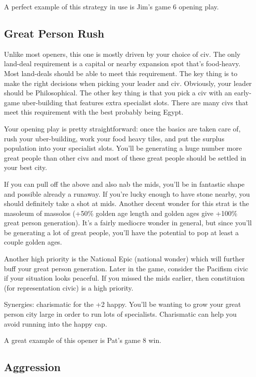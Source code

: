 \documentclass[10pt]{article}
\begin{document}
A perfect example of this strategy in use is Jim's game 6 opening play.

\subsection*{Great Person Rush}

Unlike most openers, this one is mostly driven by your choice of
civ. The only land-deal requirement is a capital or nearby expansion
spot that's food-heavy. Most land-deals should be able to meet this
requirement. The key thing is to make the right decisions when picking
your leader and civ. Obviously, your leader should be
Philosophical. The other key thing is that you pick a civ with an
early-game uber-building that features extra specialist slots. There
are many civs that meet this requirement with the best probably being
Egypt.

Your opening play is pretty straightforward: once the basics are taken
care of, rush your uber-building, work your food heavy tiles, and put
the surplus population into your specialist slots. You'll be
generating a huge number more great people than other civs and most of
these great people should be settled in your best city.

If you can pull off the above and also nab the mids, you'll be in
fantastic shape and possible already a runaway. If you're lucky enough
to have stone nearby, you should definitely take a shot at
mids. Another decent wonder for this strat is the masoleum of massolos
(+50\% golden age length and golden ages give +100\% great person
generation). It's a fairly mediocre wonder in general, but since
you'll be generating a lot of great people, you'll have the potential
to pop at least a couple golden ages.

Another high priority is the National Epic (national wonder) which
will further buff your great person generation. Later in the game,
consider the Pacifism civic if your situation looks peaceful. If you
missed the mids earlier, then constituion (for representation civic)
is a high priority.

Synergies: charismatic for the +2 happy. You'll be wanting to grow
your great person city large in order to run lots of
specialists. Charismatic can help you avoid running into the happy
cap.

A great example of this opener is Pat's game 8 win.

\subsection*{Aggression}
\end{document}
